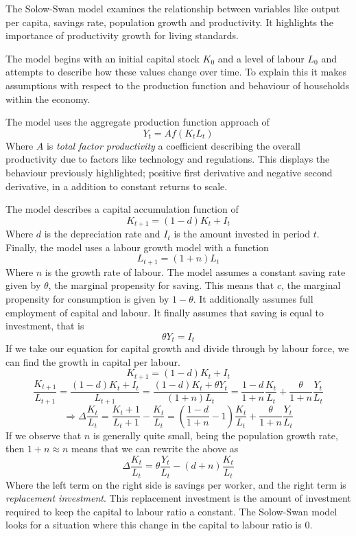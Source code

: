 \documentclass[12pt]{report}
\begin{document}
\begin{flushleft}
The Solow-Swan model examines the relationship between variables like output
per capita, savings rate, population growth and productivity. It highlights
the importance of productivity growth for living standards. \par
The model begins with an initial capital stock \(K_0\) and a level of labour
\(L_0\) and attempts to describe how these values change over time. To explain
this it makes assumptions with respect to the production function and behaviour
of households within the economy. \par
The model uses the aggregate production function approach of
\[Y_t = Af(K_tL_t)\]
Where \(A\) is \textit{total factor productivity} a coefficient describing the
overall productivity due to factors like technology and regulations. This
displays the behaviour previously highlighted; positive first derivative and
negative second derivative, in a addition to constant returns to scale. \par
The model describes a capital accumulation function of
\[K_{t + 1} = (1 - d)K_t + I_t\]
Where \(d\) is the depreciation rate and \(I_t\) is the amount invested in
period \(t\). Finally, the model uses a labour growth model with a function
\[L_{t + 1} = (1 + n)L_t\]
Where \(n\) is the growth rate of labour. The model assumes a constant saving
rate given by \(\theta\), the marginal propensity for saving. This means that
\(c\), the marginal propensity for consumption is given by \(1 - \theta\). It
additionally assumes full employment of capital and labour. It finally assumes
that saving is equal to investment, that is
\[\theta Y_t = I_t\]
If we take our equation for capital growth and divide through by labour force,
we can find the growth in capital per labour.
\[K_{t + 1} = (1 - d)K_t + I_t\]
\[\frac{K_{t + 1}}{L_{t + 1}} = \frac{(1 - d)K_t + I_t}{L_{t + 1}} 
= \frac{(1 - d)K_t + \theta Y_t}{(1 + n)L_t}
= \frac{1 - d}{1 + n}\frac{K_t}{L_t} + \frac{\theta}{1 + n}\frac{Y_t}{L_t}\]
\[\Rightarrow \Delta\frac{K_t}{L_t} = \frac{K_t + 1}{L_t + 1} - \frac{K_t}{L_t}
= \left(\frac{1 - d}{1 + n} - 1\right) \frac{K_t}{L_t}
+ \frac{\theta}{1 + n}\frac{Y_t}{L_t}\]
If we observe that \(n\) is generally quite small, being the population growth
rate, then \(1 + n \approx n\) means that we can rewrite the above as
\[\Delta \frac{K_t}{L_t} = \theta\frac{Y_t}{L_t} - (d + n)\frac{K_t}{L_t}\]
Where the left term on the right side is savings per worker, and the right term
is \textit{replacement investment}. This replacement investment is the amount
of investment required to keep the capital to labour ratio a constant. The
Solow-Swan model looks for a situation where this change in the capital to
labour ratio is \(0\).


\end{flushleft}
\end{document}
